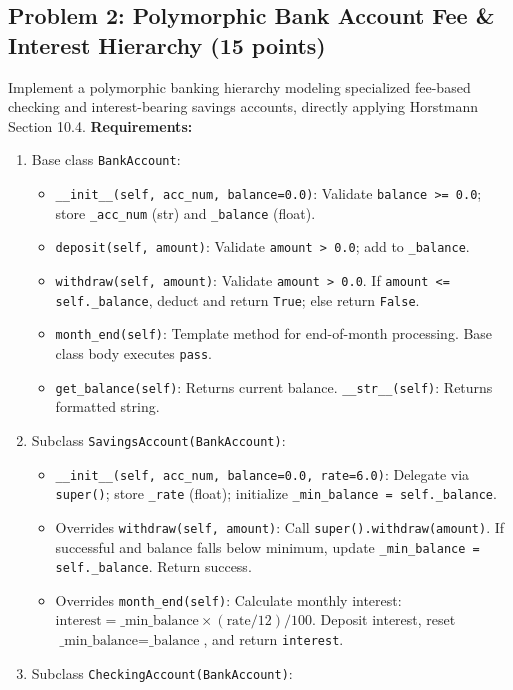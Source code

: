 \documentclass[11pt,a4paper]{article}
\begin{document}
\subsection*{Problem 2: Polymorphic Bank Account Fee \& Interest Hierarchy (15 points)}
Implement a polymorphic banking hierarchy modeling specialized fee-based checking and interest-bearing savings accounts, directly applying Horstmann Section 10.4.
\textbf{Requirements:}
\begin{enumerate}[label=\arabic*.,leftmargin=2em,itemsep=1.0pt]
\item Base class \texttt{BankAccount}:
  \begin{itemize}[itemsep=0.5pt]
  \item \texttt{\_\_init\_\_(self, acc\_num, balance=0.0)}: Validate \texttt{balance >= 0.0}; store \texttt{\_acc\_num} (str) and \texttt{\_balance} (float).
  \item \texttt{deposit(self, amount)}: Validate \texttt{amount > 0.0}; add to \texttt{\_balance}.
  \item \texttt{withdraw(self, amount)}: Validate \texttt{amount > 0.0}. If \texttt{amount <= self.\_balance}, deduct and return \texttt{True}; else return \texttt{False}.
  \item \texttt{month\_end(self)}: Template method for end-of-month processing. Base class body executes \texttt{pass}.
  \item \texttt{get\_balance(self)}: Returns current balance. \texttt{\_\_str\_\_(self)}: Returns formatted string.
  \end{itemize}
\item Subclass \texttt{SavingsAccount(BankAccount)}:
  \begin{itemize}[itemsep=0.5pt]
  \item \texttt{\_\_init\_\_(self, acc\_num, balance=0.0, rate=6.0)}: Delegate via \texttt{super()}; store \texttt{\_rate} (float); initialize \texttt{\_min\_balance = self.\_balance}.
  \item Overrides \texttt{withdraw(self, amount)}: Call \lstinline|super().withdraw(amount)|. If successful and balance falls below minimum, update \texttt{\_min\_balance = self.\_balance}. Return success.
  \item Overrides \texttt{month\_end(self)}: Calculate monthly interest: $\text{interest} = \text{\_min\_balance} \times (\text{rate}/12) / 100$. Deposit interest, reset $\text{\_min\_balance} = \text{\_balance}$, and return \texttt{interest}.
  \end{itemize}
\item Subclass \texttt{CheckingAccount(BankAccount)}:

\end{enumerate}
\end{document}
